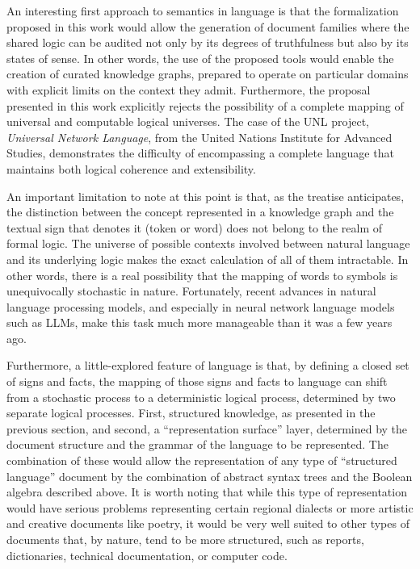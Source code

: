\documentclass{article}
\begin{document}
An interesting first approach to semantics in language is that the
formalization proposed in this work would allow the generation of
document families where the shared logic can be audited not only by its
degrees of truthfulness but also by its states of sense. In other words,
the use of the proposed tools would enable the creation of curated
knowledge graphs, prepared to operate on particular domains with
explicit limits on the context they admit. Furthermore, the proposal
presented in this work explicitly rejects the possibility of a complete
mapping of universal and computable logical universes. The case of the
UNL project, \emph{Universal Network Language}, from the United Nations
Institute for Advanced Studies, demonstrates the difficulty of
encompassing a complete language that maintains both logical coherence
and extensibility.

An important limitation to note at this point is that, as the treatise
anticipates, the distinction between the concept represented in a
knowledge graph and the textual sign that denotes it (token or word)
does not belong to the realm of formal logic. The universe of possible
contexts involved between natural language and its underlying logic
makes the exact calculation of all of them intractable. In other words,
there is a real possibility that the mapping of words to symbols is
unequivocally stochastic in nature. Fortunately, recent advances in
natural language processing models, and especially in neural network
language models such as LLMs, make this task much more manageable than
it was a few years ago.

Furthermore, a little-explored feature of language is that, by defining
a closed set of signs and facts, the mapping of those signs and facts to
language can shift from a stochastic process to a deterministic logical
process, determined by two separate logical processes. First, structured
knowledge, as presented in the previous section, and second, a
``representation surface'' layer, determined by the document structure
and the grammar of the language to be represented. The combination of
these would allow the representation of any type of ``structured
language'' document by the combination of abstract syntax trees and the
Boolean algebra described above. It is worth noting that while this type
of representation would have serious problems representing certain
regional dialects or more artistic and creative documents like poetry,
it would be very well suited to other types of documents that, by
nature, tend to be more structured, such as reports, dictionaries,
technical documentation, or computer code.
\end{document}
